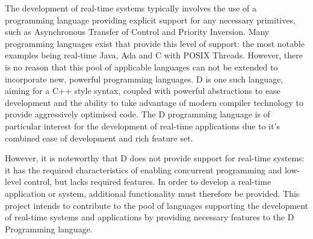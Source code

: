 
The development of real-time systems typically involves the use of a programming 
language providing explicit support for any necessary primitives, such as 
Asynchronous Transfer of Control and Priority Inversion. 
Many programming languages exist that provide this level of support: the most 
notable examples being real-time Java, Ada and C with POSIX Threads. However, 
there is no reason that this pool of applicable languages can not be extended to 
incorporate new, powerful programming languages. 
D is one such language, aiming for a C++ style syntax, coupled with powerful 
abstractions to ease development and the ability to take advantage of modern 
compiler technology to provide aggressively optimised code.
The D programming language is of particular interest for 
the development of real-time applications due to it's combined ease of development
and rich feature set. 
\par\bigskip\noindent
However, it is noteworthy that D does not provide support for real-time systems: 
it has the required characteristics of enabling concurrent programming and low-level 
control, but lacks required features. 
In order to develop a real-time application or system, additional functionality 
must therefore be provided.
This project intends to contribute to the pool of languages supporting the development 
of real-time systems and applications by providing necessary features 
to the D Programming language. 
